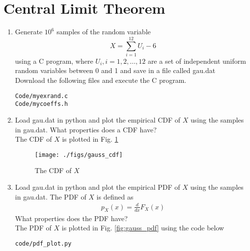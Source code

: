 \documentclass[journal,12pt,twocolumn]{IEEEtran}
\renewcommand\thesection{\arabic{section}}
\begin{document}
\section{Central Limit Theorem}
%
\begin{enumerate}[label=\thesection.\arabic*
,ref=\thesection.\theenumi]
%
%
\item
Generate $10^6$ samples of the random variable
%
\begin{equation}
X = \sum_{i=1}^{12}U_i -6
\end{equation}
%
using a C program, where $U_i, i = 1,2,\dots, 12$ are  a set of independent uniform random variables between 0 and 1
and save in a file called gau.dat
\\
\solution Download the following files and execute the  C program.
\begin{lstlisting}
Code/myexrand.c
Code/mycoeffs.h
\end{lstlisting}
\item
Load gau.dat in python and plot the empirical CDF of $X$ using the samples in gau.dat. What properties does a CDF have?
\\
\solution The CDF of $X$ is plotted in Fig. \ref{fig:gauss_cdf}
\begin{figure}
\centering
\texttt{[image: ./figs/gauss\_cdf]}
\caption{The CDF of $X$}
\label{fig:gauss_cdf}
\end{figure}
\item
Load gau.dat in python and plot the empirical PDF of $X$ using the samples in gau.dat. The PDF of $X$ is defined as
\begin{align}
p_{X}(x) = \frac{d}{dx}F_{X}(x)
\end{align}
What properties does the PDF have?
\\
\solution The PDF of $X$ is plotted in Fig. \ref{fig:gauss_pdf} using the code below
\begin{lstlisting}
code/pdf_plot.py
\end{lstlisting}


\end{enumerate}
\end{document}
